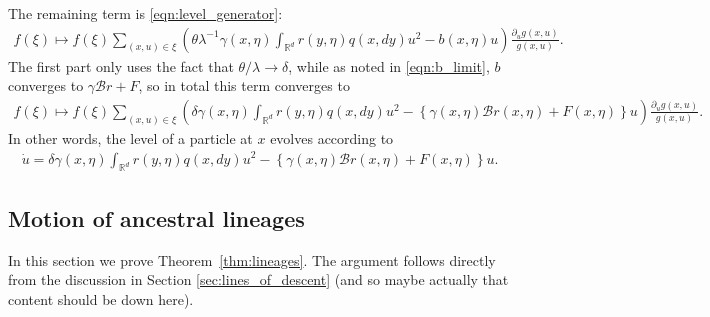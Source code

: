 \documentclass[12pt]{article}
\newcommand{\IR}{\mathbb R}
\newcommand{\DG}{\mathcal{B}}  %
\newcommand{\lp}{\xi}              %
\begin{document}
The remaining term is \eqref{eqn:level_generator}:
\begin{align*}
    f(\lp)
    \mapsto
    f(\lp)
    \sum_{(x, u) \in \lp}
    \left(
    \theta
        \lambda^{-1} \gamma(x,\eta) \int_{\IR^d} r(y, \eta) q(x, dy) u^2
        -
        b(x, \eta)u
    \right)
    \frac{\partial_u g(x,u)}{g(x,u)} .
\end{align*}
The first part only uses the fact that $\theta/\lambda \to \delta$,
while as noted in \eqref{eqn:b_limit}, $b$ converges to $\gamma \DG r + F$,
so in total this term converges to
\begin{align*}
    f(\lp)
    \mapsto
    f(\lp)
    \sum_{(x, u) \in \lp}
    \left(
    \delta
        \gamma(x,\eta) \int_{\IR^d} r(y, \eta) q(x, dy) u^2
        -
        \left\{
            \gamma(x, \eta) \DG r(x, \eta) + F(x, \eta)
        \right\} u
    \right)
    \frac{\partial_u g(x,u)}{g(x,u)} .
\end{align*}
In other words, the level of a particle at $x$ evolves according to
\begin{align*}
    \dot u
    =
    \delta
        \gamma(x,\eta) \int_{\IR^d} r(y, \eta) q(x, dy) u^2
        -
        \left\{
            \gamma(x, \eta) \DG r(x, \eta) + F(x, \eta)
        \right\} u .
\end{align*}



\subsection{Motion of ancestral lineages}

In this section we prove Theorem~\ref{thm:lineages}.
The argument follows directly from the discussion in Section \ref{sec:lines_of_descent}
(and so maybe actually that content should be down here).
\end{document}
